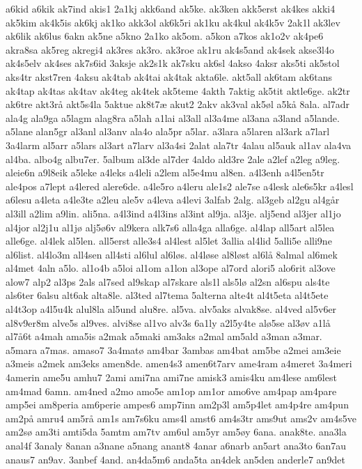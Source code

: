 {a6kid
a6kik
ak7ind
akis1
2a1kj
akk6and
ak5ke.
ak3ken
akk5erst
ak4kes
akki4
ak5kim
ak4k5is
ak6kj
ak1ko
akk3ol
ak6k5ri
ak1ku
ak4kul
ak4k5v
2ak1l
ak3lev
ak6lik
ak6lus
6akn
ak5ne
a5kno
2a1ko
ak5om.
a5kon
a7kos
ak1o2v
ak4pe6
akra8sa
ak5reg
akregi4
ak3res
ak3ro.
ak3roe
ak1ru
ak4s5and
ak4sek
akse3l4o
ak4s5elv
ak4ses
ak7s6id
3aksje
ak2s1k
ak7sku
ak6sl
4akso
4aksr
aks5ti
ak5stol
aks4tr
akst7ren
4aksu
ak4tab
ak4tai
ak4tak
akta6le.
akt5all
ak6tam
ak6tans
ak4tap
ak4tas
ak4tav
ak4teg
ak4tek
ak5teme
4akth
7aktig
ak5tit
aktle6ge.
ak2tr
ak6tre
akt3rå
akt5s4la
5aktue
ak8t7æ
akut2
2akv
ak3val
ak5øl
a5kå
8ala.
al7adr
ala4g
ala9ga
a5lagm
alag8ra
a5lah
a1lai
al3all
al3a4me
al3ana
a3land
a5lande.
a5lane
alan5gr
al3anl
al3anv
ala4o
ala5pr
a5lar.
a3lara
a5laren
al3ark
a7larl
3a4larm
al5arr
a5lars
al3art
a7larv
al3a4si
2alat
ala7tr
4alau
al5auk
al1av
ala4va
al4ba.
albo4g
albu7er.
5album
al3de
al7der
4aldo
ald3re
2ale
a2lef
a2leg
a9leg.
aleie6n
a9l8eik
a5leke
a4leks
a4leli
a2lem
al5e4mu
al8en.
a4l3enh
a4l5en5tr
ale4pos
a7lept
a4lered
alere6de.
a4le5ro
a4leru
ale1s2
ale7se
a4lesk
ale6s5kr
a4lesl
a6lesu
a4leta
a4le3te
a2leu
ale5v
a4leva
a4levi
3alfab
2alg.
al3geb
al2gu
al4går
al3ill
a2lim
a9lin.
ali5na.
a4l3ind
a4l3ins
al3int
al9ja.
al3je.
alj5end
al3jer
al1jo
al4jor
al2j1u
al1jø
alj5ø6v
al9kera
alk7s6
alla4ga
alla6ge.
al4lap
all5art
al5lea
alle6ge.
al4lek
al5len.
all5erst
alle3s4
al4lest
al5let
3allia
al4lid
5alli5e
alli9ne
al6list.
al4lo3m
all4sen
all4sti
al6lul
al6løs.
al4løse
al8løst
al6lå
8almal
al6mek
al4met
4aln
a5lo.
al1o4b
a5loi
al1om
a1lon
al3ope
al7ord
alori5
alo6rit
al3ove
alow7
alp2
al3ps
2als
al7sed
al9skap
al7skare
als1l
als5lø
al2sn
al6spu
als4te
als6ter
6alsu
alt6ak
alta8le.
al3ted
al7tema
5alterna
alte4t
al4t5eta
al4t5ete
al4t3op
a4l5u4k
alul8la
al5und
alu8re.
al5va.
alv5aks
alvak8se.
al4ved
al5v6er
al8v9er8m
alve5s
al9ves.
alvi8se
al1vo
alv3s
6a1ly
a2l5y4te
alø5se
al3øv
a1lå
al7å6t
a4mah
ama5is
a2mak
a5maki
am3aks
a2mal
am5ald
a3man
a3mar.
a5mara
a7mas.
amaso7
3a4matø
am4bar
3ambas
am4bat
am5be
a2mei
am3eie
a3meis
a2mek
am3eks
amen8de.
amen4s3
amen6t7arv
ame4ram
a4meret
3a4meri
4amerin
ame5u
amhu7
2ami
ami7na
ami7ne
amisk3
amis4ku
am4lese
am6lest
am4mad
6amn.
am4ned
a2mo
amo5e
am1op
am1or
amo6ve
am4pap
am4pare
amp5ei
am8peria
am6perie
ampes6
amp7inn
am2p3l
am5p4let
am4p4re
am4pun
am2på
amru4
am5rå
am1s
am7s6ku
ams4l
amst6
am4s3tr
ams9ut
ams2v
am4s5ve
am2sø
am3ti
amti5da
5amtm
am7tv
am6ul
am5yr
am5øy
6ana.
anak8te.
ana3la
anal4f
3analy
8anan
a3nane
a5nang
anant8
4anar
a6narb
an5art
ana3to
6an7au
anaus7
an9av.
3anbef
4and.
an4da5m6
anda5ta
an4dek
an5den
anderle7
an9det
}
